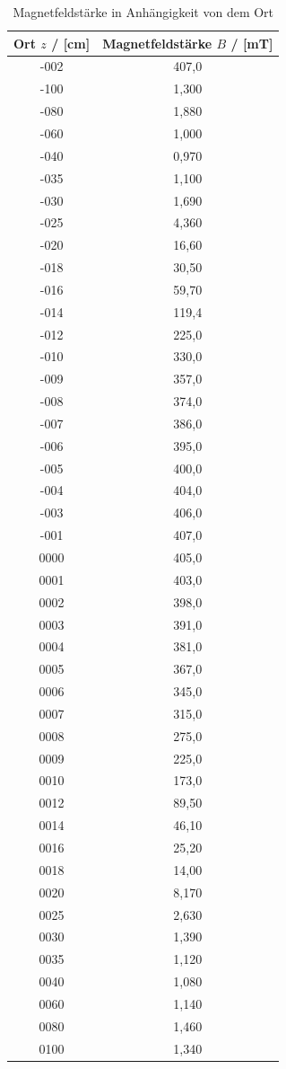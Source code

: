 \begin{table}[H]
  \centering
  \begin{tabular}{cc}
    \toprule
    Ort $z$ / [cm] & Magnetfeldstärke $B$ / [mT] \\
    \midrule
    -002 & 407,0 \\
    -100 & 1,300 \\
    -080 & 1,880 \\
    -060 & 1,000 \\
    -040 & 0,970 \\
    -035 & 1,100 \\
    -030 & 1,690 \\
    -025 & 4,360 \\
    -020 & 16,60 \\
    -018 & 30,50 \\
    -016 & 59,70 \\
    -014 & 119,4 \\
    -012 & 225,0 \\
    -010 & 330,0 \\
    -009 & 357,0 \\
    -008 & 374,0 \\
    -007 & 386,0 \\
    -006 & 395,0 \\
    -005 & 400,0 \\
    -004 & 404,0 \\
    -003 & 406,0 \\
    -001 & 407,0 \\
    0000 & 405,0 \\
    0001 & 403,0 \\
    0002 & 398,0 \\
    0003 & 391,0 \\
    0004 & 381,0 \\
    0005 & 367,0 \\
    0006 & 345,0 \\
    0007 & 315,0 \\
    0008 & 275,0 \\
    0009 & 225,0 \\
    0010 & 173,0 \\
    0012 & 89,50 \\
    0014 & 46,10 \\
    0016 & 25,20 \\
    0018 & 14,00 \\
    0020 & 8,170 \\
    0025 & 2,630 \\
    0030 & 1,390 \\
    0035 & 1,120 \\
    0040 & 1,080 \\
    0060 & 1,140 \\
    0080 & 1,460 \\
    0100 & 1,340 \\
    \bottomrule
  \end{tabular}
  \caption{Magnetfeldstärke in Anhängigkeit von dem Ort}
  \label{tab:B(z)}
\end{table}

